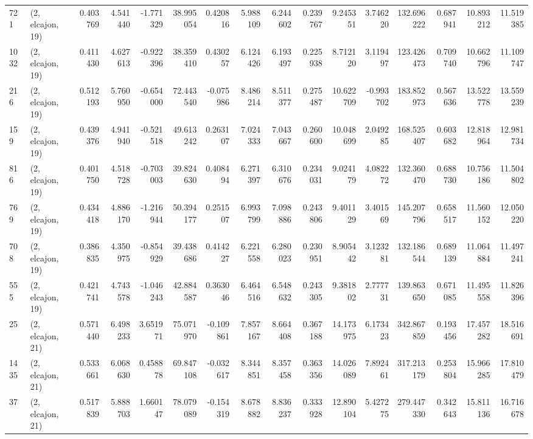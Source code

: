 \begin{tabular}{llrrrrrrrrrrrrrr}
721  &  (2, elcajon, 19) &   0.403769 &   4.541440 &  -1.771329 &     38.995054 &    0.420816 &    5.988109 &    6.244602 &  0.239767 &   9.245351 &   3.746220 &   132.696222 &   0.687941 &  10.893212 &  11.519385 \\
1032 &  (2, elcajon, 19) &   0.411430 &   4.627613 &  -0.922396 &     38.359410 &    0.430257 &    6.124426 &    6.193497 &  0.225938 &   8.712120 &   3.119497 &   123.426473 &   0.709740 &  10.662796 &  11.109747 \\
216  &  (2, elcajon, 19) &   0.512193 &   5.760950 &  -0.654000 &     72.443540 &   -0.075986 &    8.486214 &    8.511377 &  0.275487 &  10.622709 &  -0.993702 &   183.852973 &   0.567636 &  13.522778 &  13.559239 \\
159  &  (2, elcajon, 19) &   0.439376 &   4.941940 &  -0.521518 &     49.613242 &    0.263107 &    7.024333 &    7.043667 &  0.260600 &  10.048699 &   2.049285 &   168.525407 &   0.603682 &  12.818964 &  12.981734 \\
816  &  (2, elcajon, 19) &   0.401750 &   4.518728 &  -0.703003 &     39.824630 &    0.408494 &    6.271397 &    6.310676 &  0.234031 &   9.024179 &   4.082272 &   132.360470 &   0.688730 &  10.756186 &  11.504802 \\
769  &  (2, elcajon, 19) &   0.434418 &   4.886170 &  -1.216944 &     50.394177 &    0.251507 &    6.993799 &    7.098886 &  0.243806 &   9.401129 &   3.401569 &   145.207796 &   0.658517 &  11.560152 &  12.050220 \\
708  &  (2, elcajon, 19) &   0.386835 &   4.350975 &  -0.854929 &     39.438686 &    0.414227 &    6.221558 &    6.280023 &  0.230951 &   8.905442 &   3.123281 &   132.186544 &   0.689139 &  11.064884 &  11.497241 \\
555  &  (2, elcajon, 19) &   0.421741 &   4.743578 &  -1.046243 &     42.884587 &    0.363046 &    6.464516 &    6.548632 &  0.243305 &   9.381802 &   2.777731 &   139.863650 &   0.671085 &  11.495558 &  11.826396 \\
25   &  (2, elcajon, 21) &   0.571440 &   6.498233 &   3.651971 &     75.071970 &   -0.109861 &    7.857167 &    8.664408 &  0.367188 &  14.173975 &   6.173423 &   342.867859 &   0.193456 &  17.457282 &  18.516691 \\
1435 &  (2, elcajon, 21) &   0.533661 &   6.068630 &   0.458878 &     69.847108 &   -0.032617 &    8.344851 &    8.357458 &  0.363356 &  14.026089 &   7.892461 &   317.213179 &   0.253804 &  15.966285 &  17.810479 \\
37   &  (2, elcajon, 21) &   0.517839 &   5.888703 &   1.660147 &     78.079089 &   -0.154319 &    8.678882 &    8.836237 &  0.333928 &  12.890104 &   5.427275 &   279.447330 &   0.342643 &  15.811136 &  16.716678 \\

\end{tabular}
